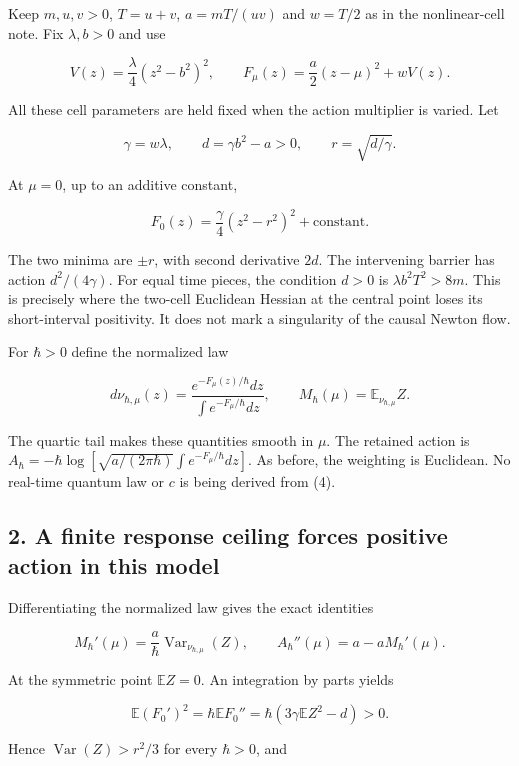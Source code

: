 \documentclass[11pt,a4paper]{article}
\begin{document}
Keep \(m,u,v>0\), \(T=u+v\), \(a=mT/(uv)\) and \(w=T/2\) as in the
nonlinear-cell note. Fix \(\lambda,b>0\) and use

\[
 V(z)=\frac\lambda4(z^2-b^2)^2,\qquad
 F_\mu(z)=\frac a2(z-\mu)^2+wV(z).
 \tag{1}
\]

All these cell parameters are held fixed when the action multiplier is
varied. Let

\[
 \gamma=w\lambda,\qquad d=\gamma b^2-a>0,
 \qquad r=\sqrt{d/\gamma}.
 \tag{2}
\]

At \(\mu=0\), up to an additive constant,

\[F_0(z)=\frac\gamma4(z^2-r^2)^2+\text{constant}.\tag{3}\]

The two minima are \(\pm r\), with second derivative \(2d\). The
intervening barrier has action \(d^2/(4\gamma)\). For equal time pieces,
the condition \(d>0\) is \(\lambda b^2T^2>8m\). This is precisely where
the two-cell Euclidean Hessian at the central point loses its
short-interval positivity. It does not mark a singularity of the causal
Newton flow.

For \(\hbar>0\) define the normalized law

\[
 d\nu_{\hbar,\mu}(z)=\frac{e^{-F_\mu(z)/\hbar}dz}
                              {\int e^{-F_\mu/\hbar}dz},
 \qquad M_\hbar(\mu)=\mathbb E_{\nu_{\hbar,\mu}}Z.
 \tag{4}
\]

The quartic tail makes these quantities smooth in \(\mu\). The retained
action is
\(A_\hbar=-\hbar\log[\sqrt{a/(2\pi\hbar)}\int e^{-F_\mu/\hbar}dz]\). As
before, the weighting is Euclidean. No real-time quantum law or \(c\) is
being derived from (4).

\subsection{2. A finite response ceiling forces positive action in this
model}\label{a-finite-response-ceiling-forces-positive-action-in-this-model}

Differentiating the normalized law gives the exact identities

\[
 M_\hbar'(\mu)=\frac a\hbar\operatorname{Var}_{\nu_{\hbar,\mu}}(Z),
 \qquad
 A_\hbar''(\mu)=a-aM_\hbar'(\mu).
 \tag{5}
\]

At the symmetric point \(\mathbb EZ=0\). An integration by parts yields

\[
 \mathbb E(F_0')^2=\hbar\mathbb EF_0''
       =\hbar(3\gamma\mathbb EZ^2-d)>0.
 \tag{6}
\]

Hence \(\operatorname{Var}(Z)>r^2/3\) for every \(\hbar>0\), and
\end{document}
